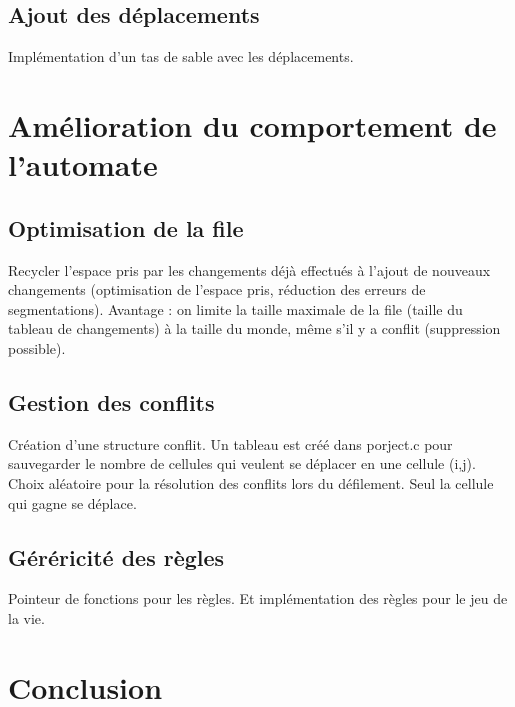 \subsection{Ajout des déplacements}
Implémentation d'un tas de sable avec les déplacements.

\section{Amélioration du comportement de l'automate}
\subsection{Optimisation de la file}
Recycler l'espace pris par les changements déjà effectués à l'ajout de nouveaux changements (optimisation de l'espace pris, réduction des erreurs de segmentations).
Avantage : on limite la taille maximale de la file (taille du tableau de changements) à la taille du monde, même s'il y a conflit (suppression possible).

\subsection{Gestion des conflits}
Création d'une structure conflit. 
Un tableau est créé dans porject.c pour sauvegarder le nombre de cellules qui veulent se déplacer en une cellule (i,j). 
Choix aléatoire pour la résolution des conflits lors du défilement. Seul la cellule qui gagne se déplace.

\subsection{Géréricité des règles}
Pointeur de fonctions pour les règles. Et implémentation des règles pour le jeu de la vie.

\section{Conclusion}
